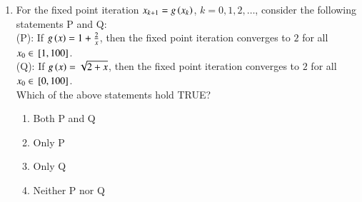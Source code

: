 \documentclass[journal]{IEEEtran}
\begin{document}
\begin{enumerate}[start=1]
\item For the fixed point iteration $x_{k+1} = g\left(x_k\right)$, $k = 0, 1, 2, \dots$, consider the following statements P and Q:\\

(P): If $g\left(x\right) = 1 + \frac{2}{x}$, then the fixed point iteration converges to $2$ for all $x_0 \in {}\left[1, 100\right]$.\\

(Q): If $g\left(x\right) = \sqrt{2 + x}$, then the fixed point iteration converges to $2$ for all $x_0 \in {}\left[0, 100\right]$.\\

Which of the above statements hold TRUE?
\begin{multicols}{2}
\begin{enumerate}
    \item Both P and Q
    \item Only P
    \item Only Q
    \item Neither P nor Q
\end{enumerate}
\end{multicols}






\end{enumerate}
\end{document}
